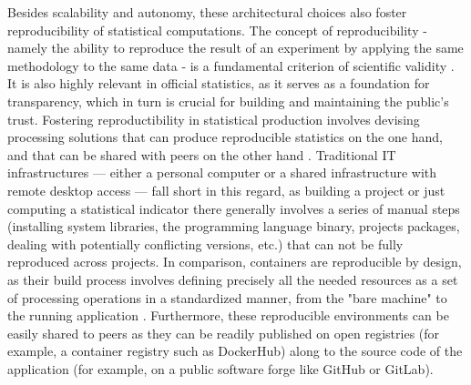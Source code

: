 
Besides scalability and autonomy, these architectural choices also foster reproducibility of statistical computations. The concept of reproducibility - namely the ability to reproduce the result of an experiment by applying the same methodology to the same data - is a fundamental criterion of scientific validity \cite{mcnutt2014reproducibility}. It is also highly relevant in official statistics, as it serves as a foundation for transparency, which in turn is crucial for building and maintaining the public's trust. Fostering reproductibility in statistical production involves devising processing solutions that can produce reproducible statistics on the one hand, and that can be shared with peers on the other hand \cite{ntts2019reproducibility}. Traditional IT infrastructures — either a personal computer or a shared infrastructure with remote desktop access — fall short in this regard, as building a project or just computing a statistical indicator there generally involves a series of manual steps (installing system libraries, the programming language binary, projects packages, dealing with potentially conflicting versions, etc.) that can not be fully reproduced across projects. In comparison, containers are reproducible by design, as their build process involves defining precisely all the needed resources as a set of processing operations in a standardized manner, from the "bare machine" to the running application \cite{moreau2023containers}. Furthermore, these reproducible environments can be easily shared to peers as they can be readily published on open registries (for example, a container registry such as DockerHub) along to the source code of the application (for example, on a public software forge like GitHub or GitLab).
